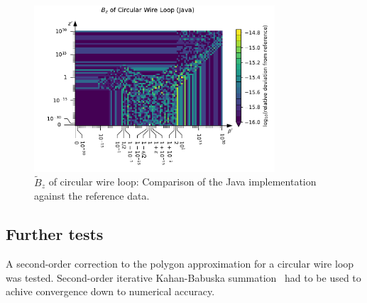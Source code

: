 \begin{figure}[htbp]
 \centering
 \includegraphics[width=0.8\textwidth]{img/CircularWireLoop_B_z_Java.pdf}
 \caption{$\tilde{B}_z$ of circular wire loop: Comparison of the Java implementation against the reference data.}
 \label{fig:CircularWireLoop_B_z_Java}
\end{figure}

\subsection{Further tests}

A second-order correction to the polygon approximation
for a circular wire loop~\cite{mcgreivy_2021} was tested.
Second-order iterative Kahan-Babuska summation~\cite{klein_2006} had to be used
to achive convergence down to numerical accuracy.

